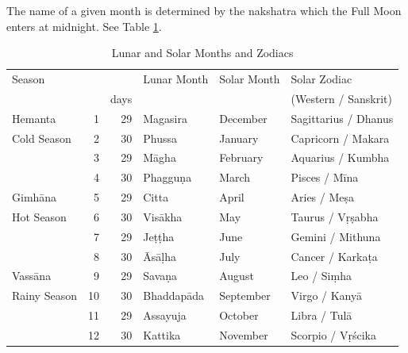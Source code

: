 \documentclass[11pt,oneside]{memoir-article}
\begin{document}
The name of a given month is determined by the nakshatra which the Full Moon
enters at midnight. See Table \ref{tbl-month-names}.

\begin{table}[h]
\caption{\label{tbl-month-names} Lunar and Solar Months and Zodiacs\autocite{hasapannyo-zodiac}}
\centering
\begin{tabular}{lrrlll}
Season &  &  & Lunar Month & Solar Month & Solar Zodiac\\
 &  & days &  &  & (Western / Sanskrit)\\
\hline
Hemanta & 1 & 29 & Magasira & December & Sagittarius / Dhanus\\
Cold Season & 2 & 30 & Phussa & January & Capricorn / Makara\\
 & 3 & 29 & Māgha & February & Aquarius / Kumbha\\
 & 4 & 30 & Phagguṇa & March & Pisces / Mīna\\
\hline
Gimhāna & 5 & 29 & Citta & April & Aries / Meṣa\\
Hot Season & 6 & 30 & Visākha & May & Taurus / Vṛṣabha\\
 & 7 & 29 & Jeṭṭha & June & Gemini / Mithuna\\
 & 8 & 30 & Āsāḷha & July & Cancer / Karkaṭa\\
\hline
Vassāna & 9 & 29 & Savaṇa & August & Leo / Siṃha\\
Rainy Season & 10 & 30 & Bhaddapāda & September & Virgo / Kanyā\\
 & 11 & 29 & Assayuja & October & Libra / Tulā\\
 & 12 & 30 & Kattika & November & Scorpio / Vṛścika\\
\end{tabular}
\end{table}
\end{document}
